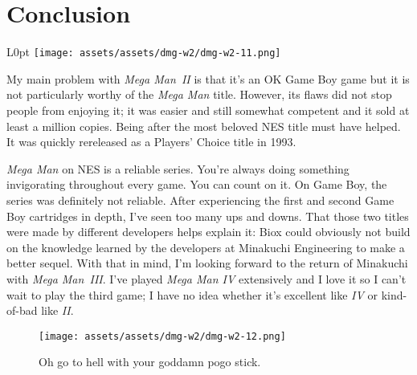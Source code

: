 \documentclass{book}
\begin{document}
\FloatBarrier\needspace{10mm}\section*{Conclusion}\nopagebreak[4]

\begin{wrapfigure}{L}{0pt} \texttt{[image: assets/assets/dmg-w2/dmg-w2-11.png]}\end{wrapfigure}
My main problem with \emph{Mega Man II} is that it’s an OK Game Boy game but it is not particularly worthy of the \emph{Mega Man} title. However, its flaws did not stop people from enjoying it; it was easier and still somewhat competent and it sold at least a million copies. Being after the most beloved NES title must have helped. It was quickly rereleased as a Players’ Choice title in 1993.

\emph{Mega Man} on NES is a reliable series. You’re always doing something invigorating throughout every game. You can count on it. On Game Boy, the series was definitely not reliable. After experiencing the first and second Game Boy cartridges in depth, I’ve seen too many ups and downs. That those two titles were made by different developers helps explain it: Biox could obviously not build on the knowledge learned by the developers at Minakuchi Engineering to make a better sequel. With that in mind, I’m looking forward to the return of Minakuchi with \emph{Mega Man III}. I’ve played \emph{Mega Man IV} extensively and I love it so I can’t wait to play the third game; I have no idea whether it’s excellent like \emph{IV} or kind-of-bad like \emph{II}.

\begin{figure}[hbt]
\vskip 10pt
\centering \texttt{[image: assets/assets/dmg-w2/dmg-w2-12.png]}\par\pagetwodescription Oh go to hell with your goddamn pogo stick.
\vskip 6pt
\end{figure}
\end{document}
